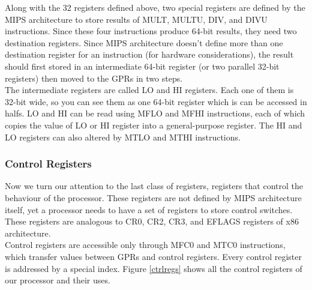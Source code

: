\documentclass[oneside]{book}
\begin{document}
Along with the 32 registers defined above, two special registers
are defined by the MIPS architecture to store results of MULT, MULTU,
DIV, and DIVU instructions. Since these four instructions produce
64-bit results, they need two destination registers. Since MIPS
architecture doesn't define more than one destination register
for an instruction (for hardware considerations), the result
should first stored in an intermediate 64-bit register (or two
parallel 32-bit registers) then moved to the GPRs in two steps.\\

The intermediate registers are called LO and HI registers. Each
one of them is 32-bit wide, so you can see them as one 64-bit
register which is can be accessed in halfs. LO
and HI can be read using MFLO and MFHI instructions, each of which
copies the value of LO or HI register into a general-purpose register.
The HI and LO registers can also altered by MTLO and MTHI instructions.

\subsubsection{Control Registers}

Now we turn our attention to the last class of registers, registers
that control the behaviour of the processor. These registers are
not defined by MIPS architecture itself, yet a processor needs
to have a set of registers to store control switches. These
registers are analogous to CR0, CR2, CR3, and EFLAGS registers of
x86 architecture.\\

Control registers are accessible only through MFC0 and MTC0 instructions,
which transfer values between GPRs and control registers. Every control
register is addressed by a special index. Figure \ref{ctrlregs} shows
all the control registers of our processor and their uses. \\
\end{document}
